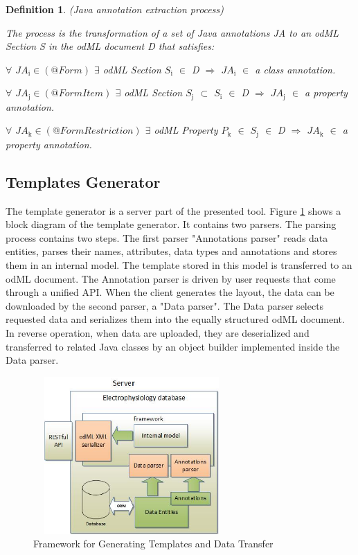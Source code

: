 \documentclass[a4paper,twoside]{article}
\newtheorem{definition}{Definition}
\begin{document}
\begin{definition}
\label{def:Java_annotation_extraction_process}
(Java annotation extraction process)

\emph{The process is the transformation of a set of Java annotations JA to an odML Section S in the odML document D that satisfies:}

\emph{$\forall$ $JA{}_{\text{i}}\in {(@Form)}$ $\exists$ odML Section $S{}_{\text{i}}$ $\in$ D $\Rightarrow$ $JA{}_{\text{i}}$ $\in$ a class annotation}.

\emph{$\forall$ $JA{}_{\text{j}}\in {(@FormItem)}$ $\exists$ odML Section $S{}_{\text{j}}$ $\subset$ $S{}_{\text{i}}$ $\in$ D $\Rightarrow$ $JA{}_{\text{j}}$ $\in$ a property
annotation}.

\emph{$\forall$ $JA{}_{\text{k}}\in {(@FormRestriction)}$ $\exists$ odML Property $P{}_{\text{k}}$ $\in$ $S{}_{\text{j}}$ $\in$ D $\Rightarrow$ $JA{}_{\text{k}}$ $\in$ a property  annotation}.

\end{definition}

\subsection{Templates Generator}

The template generator is a server part of the presented tool. Figure \ref{framework} shows a block diagram of the template generator. It contains two parsers. The parsing process contains two steps. The first parser "Annotations parser" reads data entities, parses their names, attributes, data types and annotations and stores them in an internal model. The template stored in this model is transferred to an odML document. The Annotation parser is driven by user requests that come through a unified API. When the client generates the layout, the data can be downloaded by the second parser, a "Data parser". The Data parser selects requested data and serializes them into the equally structured odML document. In reverse operation,  when data are uploaded, they are deserialized and transferred to related Java classes by an object builder implemented inside the Data parser.



\begin{figure}
\centering\includegraphics[width=7.5cm, height=6cm]{Framework}
\caption{\label{framework}Framework for Generating Templates and Data Transfer}

\end{figure}
\end{document}
